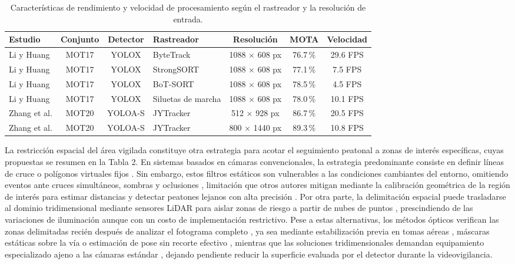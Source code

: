 \documentclass[runningheads]{llncs}
\begin{document}
\begin{table}[!ht]
\centering
\scriptsize
\setlength{\tabcolsep}{5pt}
\renewcommand{\arraystretch}{1.1}
\begin{tabular}{|l|c|c|l|c|c|c|}
\hline
{\bfseries Estudio} & {\bfseries Conjunto} & {\bfseries Detector} & {\bfseries Rastreador} & {\bfseries Resolución} & {\bfseries MOTA} & {\bfseries Velocidad}\\
\hline
Li y Huang \cite{li2024} & MOT17 & YOLOX & ByteTrack & 1088 $\times$ 608 px & 76.7\,\% & 29.6 FPS\\
\hline
Li y Huang \cite{li2024} & MOT17 & YOLOX & StrongSORT & 1088 $\times$ 608 px & 77.1\,\% & 7.5 FPS\\
\hline
Li y Huang \cite{li2024} & MOT17 & YOLOX & BoT-SORT & 1088 $\times$ 608 px & 78.5\,\% & 4.5 FPS\\
\hline
Li y Huang \cite{li2024} & MOT17 & YOLOX & Siluetas de marcha & 1088 $\times$ 608 px & 78.0\,\% & 10.1 FPS\\
\hline
Zhang et al. \cite{zhang2023} & MOT20 & YOLOA-S & JYTracker & 512 $\times$ 928 px & 86.7\,\% & 20.5 FPS\\
\hline
Zhang et al. \cite{zhang2023} & MOT20 & YOLOA-S & JYTracker & 800 $\times$ 1440 px & 89.3\,\% & 10.8 FPS\\
\hline
\end{tabular}
\vspace{2.5mm}
\caption{Características de rendimiento y velocidad de procesamiento según el rastreador y la resolución de entrada.}\label{tab1}
\end{table}



La restricción espacial del área vigilada constituye otra estrategia para acotar el seguimiento peatonal a zonas de interés específicas, cuyas propuestas se resumen en la Tabla 2. En sistemas basados en cámaras convencionales, la estrategia predominante consiste en definir líneas de cruce o polígonos virtuales fijos \cite{fedosov2021,vu2026}. Sin embargo, estos filtros estáticos son vulnerables a las condiciones cambiantes del entorno, omitiendo eventos ante cruces simultáneos, sombras y oclusiones \cite{vu2026}, limitación que otros autores mitigan mediante la calibración geométrica de la región de interés para estimar distancias y detectar peatones lejanos con alta precisión \cite{lee2026}. Por otra parte, la delimitación espacial puede trasladarse al dominio tridimensional mediante sensores LiDAR para aislar zonas de riesgo a partir de nubes de puntos \cite{zhao2025}, prescindiendo de las variaciones de iluminación aunque con un costo de implementación restrictivo. Pese a estas alternativas, los métodos ópticos verifican las zonas delimitadas recién después de analizar el fotograma completo \cite{lee2026,fedosov2021,vu2026}, ya sea mediante estabilización previa en tomas aéreas \cite{jimenez2026}, máscaras estáticas sobre la vía \cite{yang2024} o estimación de pose sin recorte efectivo \cite{thosar2025}, mientras que las soluciones tridimensionales demandan equipamiento especializado ajeno a las cámaras estándar \cite{zhao2025}, dejando pendiente reducir la superficie evaluada por el detector durante la videovigilancia.
\end{document}
